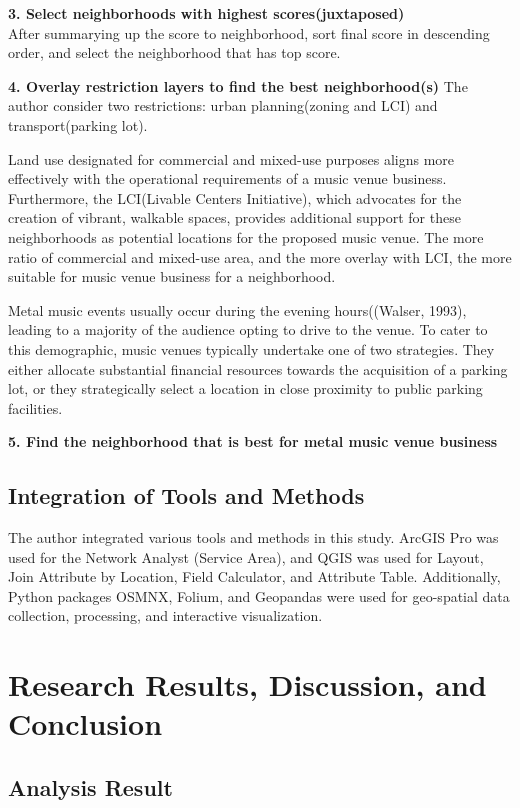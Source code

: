 \documentclass[11pt]{article}
\begin{document}
\textbf{3. Select neighborhoods with highest scores(juxtaposed)\\}
After summarying up the score to neighborhood, sort final score in descending order, and select the neighborhood that has top score.


\textbf{4. Overlay restriction layers to find the best neighborhood(s)}
The author consider two restrictions: urban planning(zoning and LCI) and transport(parking lot).  

Land use designated for commercial and mixed-use purposes aligns more effectively with the operational requirements of a music venue business. Furthermore, the LCI(Livable Centers Initiative), which advocates for the creation of vibrant, walkable spaces, provides additional support for these neighborhoods as potential locations for the proposed music venue. The more ratio of commercial and mixed-use area, and the more overlay with LCI, the more suitable for music venue business for a neighborhood.

Metal music events usually occur during the evening hours((Walser, 1993), leading to a majority of the audience opting to drive to the venue. To cater to this demographic, music venues typically undertake one of two strategies. They either allocate substantial financial resources towards the acquisition of a parking lot, or they strategically select a location in close proximity to public parking facilities. 

\textbf{5. Find the neighborhood that is best for metal music venue business}


\subsection{Integration of Tools and Methods} The author integrated various tools and methods in this study. ArcGIS Pro was used for the Network Analyst (Service Area), and QGIS was used for Layout, Join Attribute by Location, Field Calculator, and Attribute Table. Additionally, Python packages OSMNX, Folium, and Geopandas were used for geo-spatial data collection, processing, and interactive visualization. 

\section{Research Results, Discussion, and Conclusion}
\subsection{Analysis Result}
\end{document}
